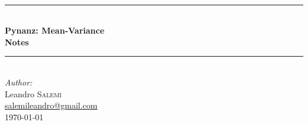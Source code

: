 \documentclass[a4paper,12pt]{report}
\begin{document}
\begin{titlepage}

\newcommand{\HRule}{\rule{\linewidth}{0.5mm}} %

\center %




\vspace{7cm}
\mbox{}\\[7cm]



\HRule \\[0.4cm]
{ \huge \bfseries Pynanz: Mean-Variance \\[0.5cm] \small Notes}\\[0.4cm] %
\HRule \\[1.5cm]
 


\Large \emph{Author:}\\
Leandro \textsc{Salemi}\\
\href{mailto:salemileandro@gmail.com}{salemileandro@gmail.com}\\[2cm] %


{\large \today}\\[4cm] %




 

\vfill %

\end{titlepage}
\end{document}
